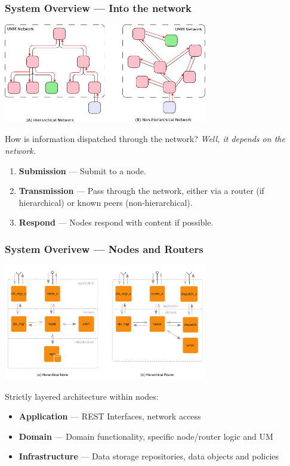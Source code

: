 \documentclass[t,handout, 10pt]{beamer}
\begin{document}
\begin{frame}
\frametitle{System Overview --- Into the network}
\centerline{\includegraphics[width=3.5in]{node-hierarchy}}
How is information dispatched through the network? {\it Well, it depends on the network.}
\pause
{\small
\begin{enumerate}
\item {\bf Submission} --- Submit to a node.
\item {\bf Transmission} --- Pass through the network, either via a router (if hierarchical) or known peers (non-hierarchical).
\item {\bf Respond} --- Nodes respond with content if possible.
\end{enumerate}
}
\end{frame}

\begin{frame}
\frametitle{System Overivew --- Nodes and Routers}
\centerline{\includegraphics[width=3.5in]{router-node-view}}
Strictly layered architecture within nodes:
{\small
\begin{itemize}
\item {\bf Application} --- REST Interfaces, network access
\item {\bf Domain} --- Domain functionality, specific node/router logic and UM
\item {\bf Infrastructure} --- Data storage repositories, data objects and policies
\end{itemize}
}
\end{frame}
\end{document}

